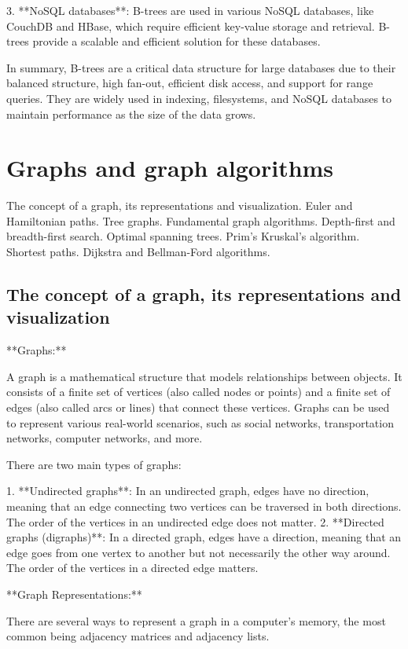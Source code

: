 \documentclass{article}
\begin{document}
3. **NoSQL databases**: B-trees are used in various NoSQL databases, like CouchDB and HBase, which require efficient key-value storage and retrieval. B-trees provide a scalable and efficient solution for these databases.

In summary, B-trees are a critical data structure for large databases due to their balanced structure, high fan-out, efficient disk access, and support for range queries. They are widely used in indexing, filesystems, and NoSQL databases to maintain performance as the size of the data grows.


\section{Graphs and graph algorithms}

The concept of a graph, its representations and visualization. Euler and Hamiltonian paths. Tree graphs. Fundamental graph algorithms. Depth-first and breadth-first search. Optimal spanning trees. Prim’s Kruskal’s algorithm. Shortest paths. Dijkstra and Bellman-Ford algorithms.


\subsection{The concept of a graph, its representations and visualization}

**Graphs:**

A graph is a mathematical structure that models relationships between objects. It consists of a finite set of vertices (also called nodes or points) and a finite set of edges (also called arcs or lines) that connect these vertices. Graphs can be used to represent various real-world scenarios, such as social networks, transportation networks, computer networks, and more.

There are two main types of graphs:

1. **Undirected graphs**: In an undirected graph, edges have no direction, meaning that an edge connecting two vertices can be traversed in both directions. The order of the vertices in an undirected edge does not matter.
2. **Directed graphs (digraphs)**: In a directed graph, edges have a direction, meaning that an edge goes from one vertex to another but not necessarily the other way around. The order of the vertices in a directed edge matters.

**Graph Representations:**

There are several ways to represent a graph in a computer's memory, the most common being adjacency matrices and adjacency lists.
\end{document}
